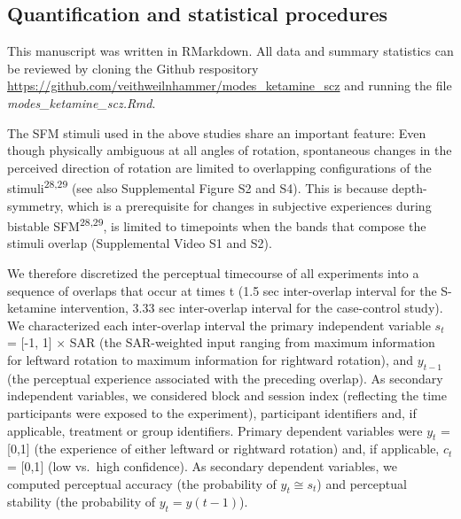 \documentclass[
]{article}
\begin{document}
\subsection{Quantification and statistical
procedures}\label{quantification-and-statistical-procedures}

This manuscript was written in RMarkdown. All data and summary
statistics can be reviewed by cloning the Github respository
\url{https://github.com/veithweilnhammer/modes_ketamine_scz} and running
the file \emph{modes\_ketamine\_scz.Rmd}.

The SFM stimuli used in the above studies share an important feature:
Even though physically ambiguous at all angles of rotation, spontaneous
changes in the perceived direction of rotation are limited to
overlapping configurations of the stimuli\textsuperscript{28,29} (see
also Supplemental Figure S2 and S4). This is because depth-symmetry,
which is a prerequisite for changes in subjective experiences during
bistable SFM\textsuperscript{28,29}, is limited to timepoints when the
bands that compose the stimuli overlap (Supplemental Video S1 and S2).

We therefore discretized the perceptual timecourse of all experiments
into a sequence of overlaps that occur at times t (1.5 sec inter-overlap
interval for the S-ketamine intervention, 3.33 sec inter-overlap
interval for the case-control study). We characterized each
inter-overlap interval the primary independent variable \(s_t\) = {[}-1,
1{]} \(\times\) SAR (the SAR-weighted input ranging from maximum
information for leftward rotation to maximum information for rightward
rotation), and \(y_{t-1}\) (the perceptual experience associated with
the preceding overlap). As secondary independent variables, we
considered block and session index (reflecting the time participants
were exposed to the experiment), participant identifiers and, if
applicable, treatment or group identifiers. Primary dependent variables
were \(y_t\) = {[}0,1{]} (the experience of either leftward or rightward
rotation) and, if applicable, \(c_t\) = {[}0,1{]} (low vs.~high
confidence). As secondary dependent variables, we computed perceptual
accuracy (the probability of \(y_t \cong s_t\)) and perceptual stability
(the probability of \(y_t = y(t - 1)\)).
\end{document}

